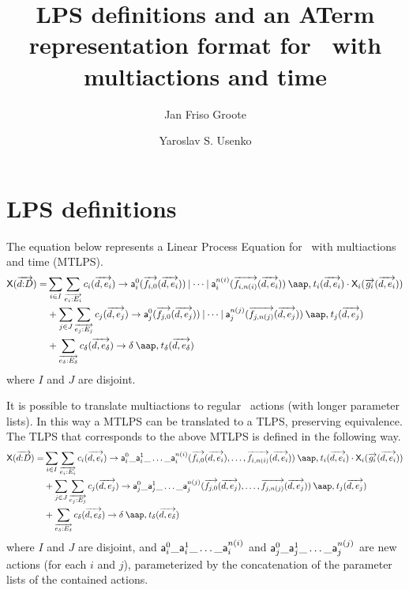 \documentclass[fleqn,a4paper,dvips]{article}
\title{LPS definitions and an ATerm representation format for \mcrl\ 
  with multiactions and time}
\author{Jan Friso Groote \and Yaroslav S. Usenko}
\begin{document}
\maketitle
\tableofcontents

\section{LPS definitions}

The equation below represents a Linear Process Equation for \mcrl\ 
with multiactions and time (MTLPS).
\begin{gather}
\begin{split}
\pr{X}(\vect{d\ap D})=&\sum_{i\in I}\sum_{\vect{e_i\ap E_i}} c_i(\vect{d,e_i})\to\act{a}^0_i(\vect{f_{i,0}}(\vect{d,e_i}))\comm\dots\comm\act{a}^{n(i)}_i(\vect{f_{i,n(i)}}(\vect{d,e_i}))\at t_i(\vect{d,e_i})\seqc
\pr{X}_i(\vect{g_i}(\vect{d,e_i}))\notag\\
&+\sum_{j\in J}\sum_{\vect{e_j\ap E_j}} c_j(\vect{d,e_j})\to\act{a}^0_j(\vect{f_{j,0}}(\vect{d,e_j}))\comm\dots\comm\act{a}^{n(j)}_j(\vect{f_{j,n(j)}}(\vect{d,e_j}))\at t_j(\vect{d,e_j})\\
&+\sum_{\vect{e_\delta\ap E_\delta}} c_\delta(\vect{d,e_\delta})\to\delta\at t_\delta(\vect{d,e_\delta})
\end{split}
\end{gather}
where $I$ and $J$ are disjoint.

It is possible to translate multiactions to regular \mcrl\ actions
(with longer parameter lists).  In this way a MTLPS can be translated
to a TLPS, preserving equivalence.  The TLPS that corresponds to the
above MTLPS is defined in the following way.
\begin{gather}
\begin{split}
\pr{X}(\vect{d\ap D})=&\sum_{i\in I}\sum_{\vect{e_i\ap E_i}} c_i(\vect{d,e_i})\to\act{a}^0_i\_\act{a}^1_i\_\dots\_\act{a}^{n(i)}_i(\vect{f_{i,0}}(\vect{d,e_i}),\dots,\vect{f_{i,n(i)}}(\vect{d,e_i}))\at t_i(\vect{d,e_i})\seqc
\pr{X}_i(\vect{g_i}(\vect{d,e_i}))\notag\\
&+\sum_{j\in J}\sum_{\vect{e_j\ap E_j}} c_j(\vect{d,e_j})\to\act{a}^0_j\_\act{a}^1_j\_\dots\_\act{a}^{n(j)}_j(\vect{f_{j,0}}(\vect{d,e_j}),\dots,\vect{f_{j,n(j)}}(\vect{d,e_j}))\at t_j(\vect{d,e_j})\\
&+\sum_{\vect{e_\delta\ap E_\delta}} c_\delta(\vect{d,e_\delta})\to\delta\at t_\delta(\vect{d,e_\delta})
\end{split}
\end{gather}
where $I$ and $J$ are disjoint, and
$\mathsf{a}^0_i\_\mathsf{a}^1_i\_\dots\_\mathsf{a}^{n(i)}_i$ and
$\mathsf{a}^0_j\_\mathsf{a}^1_j\_\dots\_\mathsf{a}^{n(j)}_j$ are new actions
(for each $i$ and $j$), parameterized by the concatenation of the
parameter lists of the contained actions.
\end{document}
